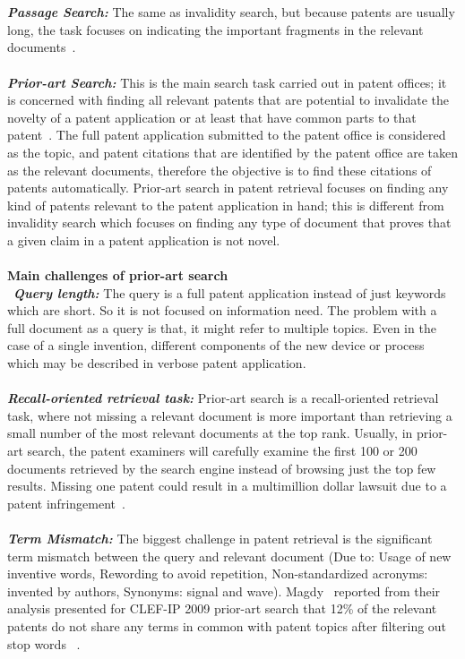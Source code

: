 \\\\
\textbf{\textit{Passage Search:}} The same as invalidity search, but because patents are usually long,
the task focuses on indicating the important fragments in the relevant documents~\citep{fujii2007overview}.\\\\
\textbf{\textit{Prior-art Search:}}
This is the main search task carried out in patent offices; it is concerned with finding all relevant patents that are potential to invalidate the novelty of a patent application or at least that have common parts to that patent~\citep{roda2010clef}. The full patent application submitted to the patent office is considered as the topic, and patent citations that are identified by the patent office are taken as the relevant documents, therefore the objective is to find these citations of patents automatically. Prior-art search in patent retrieval focuses on finding any kind of patents relevant to the patent application in hand; this is different from invalidity search which focuses on finding any type of document that proves that a given claim in a patent application is not novel.\\\\
\textbf{Main challenges of prior-art search}
\\ \
\textit{\textbf{Query length:}} The query is a full patent application instead of just keywords which are short. So it is not focused on information need. The problem with a full document as a query is that, it might refer to multiple topics. Even in the case of a single invention, different components of the new device or process which may be described in verbose patent application. \\\\
\textit{\textbf{Recall-oriented retrieval task:}} Prior-art search is a recall-oriented retrieval task, where not missing a relevant document is more important than retrieving a small number of the most relevant documents at the top rank. Usually, in prior-art search, the patent examiners will carefully examine the first 100 or 200 documents retrieved by the search engine instead of browsing just the top few results. Missing one patent could result in a multimillion dollar lawsuit due to a patent infringement~\citep{arampatzis2007access, magdy2010pres}. \\\\
\textit{\textbf{Term Mismatch: }} The biggest challenge in patent retrieval is the significant term mismatch between the query and relevant document (Due to: Usage of new inventive words, Rewording to avoid repetition, Non-standardized acronyms: invented by authors, Synonyms: signal and wave). Magdy~\citep{magdy2010exploring} reported from their analysis presented for CLEF-IP 2009 prior-art search that 12\% of the relevant patents do not share any terms in common with patent topics after filtering out stop words ~\citep{magdy2011study}.
